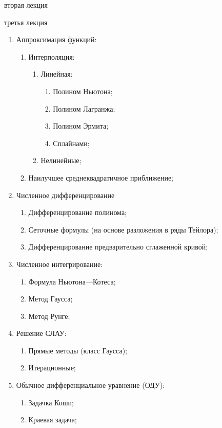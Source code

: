 вторая лекция

третья лекция

\begin{enumerate}
	\item Аппроксимация функций:
	\begin{enumerate}
		\item Интерполяция:
		\begin{enumerate}
			\item Линейная:
			\begin{enumerate}
				\item Полином Ньютона;
				\item Полином Лагранжа;
				\item Полином Эрмита;
				\item Сплайнами;
			\end{enumerate}
			\item Нелинейные;
		\end{enumerate}
		\item Наилучшее среднеквадратичное приближение;
	\end{enumerate}
	\item Численное дифференцирование
	\begin{enumerate}
		\item Дифференцирование полинома;
		\item Сеточные формулы (на основе разложения в ряды Тейлора);
		\item Дифференцирование предварительно сглаженной кривой;
	\end{enumerate}
	\item Численное интегрирование:
	\begin{enumerate}
		\item Формула Ньютона---Котеса;
		\item Метод Гаусса;
		\item Метод Рунге;
	\end{enumerate}
	\item Решение СЛАУ:
	\begin{enumerate}
		\item Прямые методы (класс Гаусса);
		\item Итерационные;
	\end{enumerate}
	\item Обычное дифференциальное уравнение (ОДУ):
	\begin{enumerate}
		\item Задачка Коши;
		\item Краевая задача;
	\end{enumerate}

\end{enumerate}
